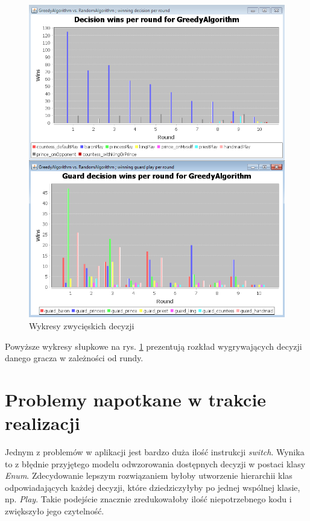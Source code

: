 \begin{figure}[H]
	\centering
	\includegraphics[width=\textwidth]{Resources/decisionWinsPerRoundChart.PNG}
	\caption{Wykresy zwycięskich decyzji} 
	\label{fig:decisionChart}
\end{figure}

Powyższe wykresy słupkowe na rys. \ref{fig:decisionChart} prezentują rozkład wygrywających decyzji danego gracza w zależności od rundy.

\section{Problemy napotkane w trakcie realizacji}
Jednym z problemów w aplikacji jest bardzo duża ilość instrukcji \textit{switch}. Wynika to z błędnie przyjętego modelu odwzorowania dostępnych decyzji w postaci klasy \textit{Enum}. Zdecydowanie lepszym rozwiązaniem byłoby utworzenie hierarchii klas odpowiadających każdej decyzji, które dziedziczyłyby po jednej wspólnej klasie, np. \textit{Play}. Takie podejście znacznie zredukowałoby ilość niepotrzebnego kodu i zwiększyło jego czytelność.

